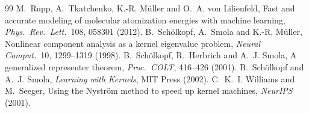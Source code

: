 \documentclass[11pt]{article}
\begin{document}
\begin{thebibliography}{99}
 M.~Rupp, A.~Tkatchenko, K.-R. M\"uller and O.~A. von Lilienfeld, Fast and accurate modeling of molecular atomization energies with machine learning, \emph{Phys.\ Rev.\ Lett.}\ 108, 058301 (2012).
 B.~Sch\"olkopf, A.~Smola and K.-R. M\"uller, Nonlinear component analysis as a kernel eigenvalue problem, \emph{Neural Comput.}\ 10, 1299--1319 (1998).
 B.~Sch\"olkopf, R.~Herbrich and A.~J. Smola, A generalized representer theorem, \emph{Proc.\ COLT}, 416--426 (2001).
 B.~Sch\"olkopf and A.~J. Smola, \emph{Learning with Kernels}, MIT Press (2002).
 C.~K.~I. Williams and M.~Seeger, Using the Nystr\"om method to speed up kernel machines, \emph{NeurIPS} (2001).
\end{thebibliography}

\SourceNote
\end{document}
